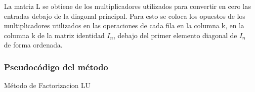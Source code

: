 \documentclass[12pt]{article}
\begin{document}
La matriz L se obtiene de los multiplicadores utilizados para convertir
en cero las entradas debajo de la diagonal principal. Para esto se
coloca los opuestos de los multiplicadores utilizados en las operaciones
de cada fila en la columna k, en la columna k de la matriz identidad
\(I_n\), debajo del primer elemento diagonal de \(I_n\) de forma ordenada.

\subsubsection{Pseudocódigo del método}
\begin{algorithm}[H]
\caption{Método de Factorizacion LU}
    \SetAlgoLined
    
    
\end{algorithm}
\end{document}
